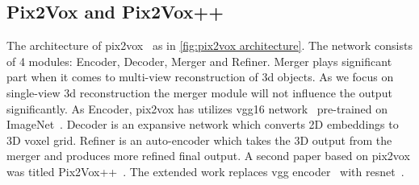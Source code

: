 \subsection{Pix2Vox and Pix2Vox++}\label{subsec:pix2vox-and-pix2vox++}
The architecture of pix2vox~\cite{Xie_2019} as in \autoref{fig:pix2vox architecture}.
The network consists of 4 modules: Encoder, Decoder, Merger and Refiner.
Merger plays significant part when it comes to multi-view reconstruction of 3d objects.
As we focus on single-view 3d reconstruction the merger module will not influence the output significantly.
As Encoder, pix2vox has utilizes \gls{vgg}16 network~\cite{simonyan2015deep} pre-trained on ImageNet~\cite{Deng2009ImageNetAL}.
Decoder is an expansive network which converts 2D embeddings to 3D voxel grid.
Refiner is an auto-encoder which takes the 3D output from the merger and produces more refined final output.
A second paper based on pix2vox was titled Pix2Vox++~\cite{Xie_2020}.
The extended work replaces \gls{vgg} encoder~\cite{simonyan2015deep} with \gls{resnet}~\cite{He2016DeepRL}.

